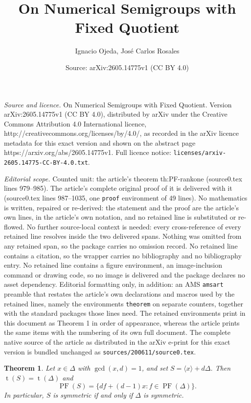 \documentclass[10pt,a4paper]{amsart}
\title{On Numerical Semigroups with Fixed Quotient}
\author{Ignacio Ojeda, Jos\'e Carlos Rosales}
\date{Source: arXiv:2605.14775v1 (CC BY 4.0)}
\newtheorem{theorem}{Theorem}
\begin{document}
\maketitle

\noindent\emph{Source and licence.} On Numerical Semigroups with Fixed Quotient. Version arXiv:2605.14775v1 (CC BY 4.0), distributed by arXiv under the Creative Commons Attribution 4.0 International licence, http://creativecommons.org/licenses/by/4.0/, as recorded in the arXiv licence metadata for this exact version and shown on the abstract page https://arxiv.org/abs/2605.14775v1. Full licence notice: \texttt{licenses/arxiv-2605.14775-CC-BY-4.0.txt}.\par\smallskip

\noindent\textit{Editorial scope.} Counted unit: the article's theorem th:PF-rankone (source0.tex lines 979--985). The article's complete original proof of it is delivered with it (source0.tex lines 987--1035, one \texttt{proof} environment of 49 lines). No mathematics is written, repaired or re-derived: the statement and the proof are the article's own lines, in the article's own notation, and no retained line is substituted or re-flowed.  No further source-local context is needed: every cross-reference of every retained line resolves inside the two delivered spans.  Nothing was omitted from any retained span, so the package carries no omission record.  No retained line contains a citation, so the wrapper carries no bibliography and no bibliography entry.  No retained line contains a figure environment, an image-inclusion command or drawing code, so no image is delivered and the package declares no asset dependency.  Editorial formatting only, in addition: an AMS \texttt{amsart} preamble that restates the article's own declarations and macros used by the retained lines, namely the environments \texttt{theorem} on separate counters, together with the standard packages those lines need.  The retained environments print in this document as Theorem 1 in order of appearance, whereas the article prints the same items with the numbering of its own full document.  The complete native source of the article as distributed in the arXiv e-print for this exact version is bundled unchanged as \texttt{sources/200611/source0.tex}.
\begin{theorem}\label{th:PF-rankone}
Let $x\in \Delta$ with $\gcd(x,d)=1$, and set $S=\langle x\rangle+d\Delta$. Then $\operatorname{t}(S)=\operatorname{t}(\Delta)$ and
\[
\operatorname{PF}(S)=\{df+(d-1)x : f\in \operatorname{PF}(\Delta)\}.
\]
In particular, $S$ is symmetric if and only if $\Delta$ is symmetric.
\end{theorem}
\end{document}
